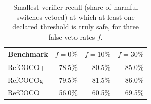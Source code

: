 \begin{table}[H]
\caption{Smallest verifier recall (share of harmful switches vetoed) at which at
least one declared threshold is truly safe, for three false-veto rates $f$.\label{tab:min-recall}}
\centering
\small
\begin{tabular}{@{}lrrr@{}}
\toprule
Benchmark & $f=0\%$ & $f=10\%$ & $f=30\%$ \\
\midrule
RefCOCO+ & 78.5\% & 80.5\% & 85.0\% \\
RefCOCOg & 79.5\% & 81.5\% & 86.0\% \\
RefCOCO & 56.0\% & 60.5\% & 69.5\% \\
\bottomrule
\end{tabular}
\end{table}
